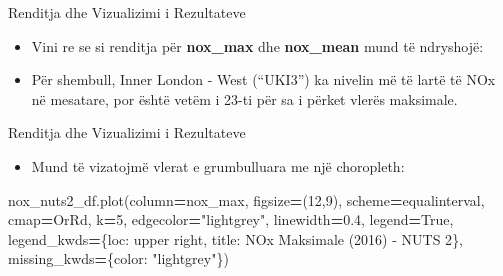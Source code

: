 \documentclass[
  ignorenonframetext,
]{beamer}
\newenvironment{Shaded}{\begin{snugshade}}{\end{snugshade}}
\newcommand{\DecValTok}[1]{\textcolor[rgb]{0.00,0.00,0.81}{#1}}
\newcommand{\FloatTok}[1]{\textcolor[rgb]{0.00,0.00,0.81}{#1}}
\newcommand{\NormalTok}[1]{#1}
\newcommand{\OperatorTok}[1]{\textcolor[rgb]{0.81,0.36,0.00}{\textbf{#1}}}
\newcommand{\StringTok}[1]{\textcolor[rgb]{0.31,0.60,0.02}{#1}}
\newcommand{\VariableTok}[1]{\textcolor[rgb]{0.00,0.00,0.00}{#1}}
\providecommand{\tightlist}{%
  \setlength{\itemsep}{0pt}\setlength{\parskip}{0pt}}
\begin{document}
\begin{frame}{Renditja dhe Vizualizimi i Rezultateve}
\protect\hypertarget{renditja-dhe-vizualizimi-i-rezultateve-8}{}
\begin{itemize}
\item
  Vini re se si renditja për \textbf{nox\_max} dhe \textbf{nox\_mean}
  mund të ndryshojë:
\item
  Për shembull, Inner London - West (``UKI3'') ka nivelin më të lartë të
  NOx në mesatare, por është vetëm i 23-ti për sa i përket vlerës
  maksimale.
\end{itemize}
\end{frame}

\begin{frame}[fragile]{Renditja dhe Vizualizimi i Rezultateve}
\protect\hypertarget{renditja-dhe-vizualizimi-i-rezultateve-9}{}
\begin{itemize}
\tightlist
\item
  Mund të vizatojmë vlerat e grumbulluara me një choropleth:
\end{itemize}


\begin{Shaded}
\begin{Highlighting}[]
\NormalTok{nox\_nuts2\_df.plot(column}\OperatorTok{=}\StringTok{\textquotesingle{}nox\_max\textquotesingle{}}\NormalTok{, figsize}\OperatorTok{=}\NormalTok{(}\DecValTok{12}\NormalTok{,}\DecValTok{9}\NormalTok{), scheme}\OperatorTok{=}\StringTok{\textquotesingle{}equalinterval\textquotesingle{}}\NormalTok{, cmap}\OperatorTok{=}\StringTok{\textquotesingle{}OrRd\textquotesingle{}}\NormalTok{, k}\OperatorTok{=}\DecValTok{5}\NormalTok{,}
\NormalTok{    edgecolor}\OperatorTok{=}\StringTok{"lightgrey"}\NormalTok{, linewidth}\OperatorTok{=}\FloatTok{0.4}\NormalTok{,}
\NormalTok{    legend}\OperatorTok{=}\VariableTok{True}\NormalTok{, legend\_kwds}\OperatorTok{=}\NormalTok{\{}\StringTok{\textquotesingle{}loc\textquotesingle{}}\NormalTok{: }\StringTok{\textquotesingle{}upper right\textquotesingle{}}\NormalTok{, }\StringTok{\textquotesingle{}title\textquotesingle{}}\NormalTok{: }\StringTok{\textquotesingle{}NOx Maksimale (2016) {-} NUTS 2\textquotesingle{}}\NormalTok{\},}
\NormalTok{    missing\_kwds}\OperatorTok{=}\NormalTok{\{}\StringTok{\textquotesingle{}color\textquotesingle{}}\NormalTok{: }\StringTok{"lightgrey"}\NormalTok{\})}
\end{Highlighting}
\end{Shaded}
\end{frame}
\end{document}
